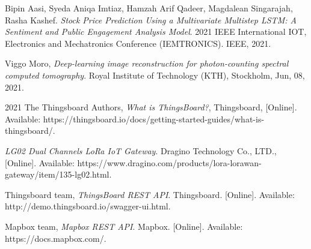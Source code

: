 \documentclass{Classes/UITBA}
\begin{document}
\begin{thebibliography}{SJL05}
 Bipin Aasi, Syeda Aniqa Imtiaz, Hamzah Arif Qadeer, Magdalean Singarajah, Rasha Kashef. \textit{Stock Price Prediction Using a Multivariate Multistep LSTM: A Sentiment and Public Engagement Analysis Model}. 2021 IEEE International IOT, Electronics and Mechatronics Conference (IEMTRONICS). IEEE, 2021.

 Viggo Moro, \textit{Deep-learning image reconstruction for photon-counting spectral computed tomography}. Royal Institute of Technology (KTH), Stockholm, Jun, 08, 2021.

 2021 The Thingsboard Authors, \textit{What is ThingsBoard?}, Thingsboard, [Online]. Available: https://thingsboard.io/docs/getting-started-guides/what-is-thingsboard/.

 \textit{LG02 Dual Channels LoRa IoT Gateway}. Dragino Technology Co., LTD., [Online]. Available: https://www.dragino.com/products/lora-lorawan-gateway/item/135-lg02.html.

 Thingsboard team, \textit{ThingsBoard REST API}. Thingsboard. [Online]. Available: http://demo.thingsboard.io/swagger-ui.html.

 Mapbox team, \textit{Mapbox REST API}. Mapbox. [Online]. Available: https://docs.mapbox.com/.

\end{thebibliography}
\end{document}
